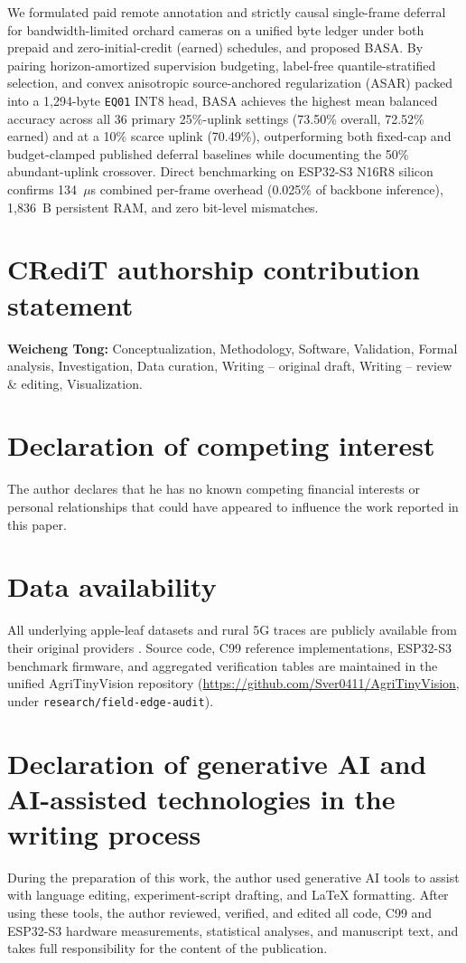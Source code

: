 \documentclass[preprint,12pt,authoryear]{elsarticle}
\begin{document}
We formulated paid remote annotation and strictly causal single-frame deferral for bandwidth-limited orchard cameras on a unified byte ledger under both prepaid and zero-initial-credit (earned) schedules, and proposed BASA. By pairing horizon-amortized supervision budgeting, label-free quantile-stratified selection, and convex anisotropic source-anchored regularization (ASAR) packed into a 1,294-byte \texttt{EQ01} INT8 head, BASA achieves the highest mean balanced accuracy across all 36 primary 25\%-uplink settings (73.50\% overall, 72.52\% earned) and at a 10\% scarce uplink (70.49\%), outperforming both fixed-cap and budget-clamped published deferral baselines while documenting the 50\% abundant-uplink crossover. Direct benchmarking on ESP32-S3 N16R8 silicon confirms 134~$\mu$s combined per-frame overhead (0.025\% of backbone inference), 1,836~B persistent RAM, and zero bit-level mismatches.

\section*{CRediT authorship contribution statement}
\textbf{Weicheng Tong:} Conceptualization, Methodology, Software, Validation, Formal analysis, Investigation, Data curation, Writing -- original draft, Writing -- review \& editing, Visualization.

\section*{Declaration of competing interest}
The author declares that he has no known competing financial interests or personal relationships that could have appeared to influence the work reported in this paper.

\section*{Data availability}
All underlying apple-leaf datasets and rural 5G traces are publicly available from their original providers \citep{singh2020,cornell,kashmir,latvia,forest}. Source code, C99 reference implementations, ESP32-S3 benchmark firmware, and aggregated verification tables are maintained in the unified AgriTinyVision repository (\url{https://github.com/Sver0411/AgriTinyVision}, under \texttt{research/field-edge-audit}).

\section*{Declaration of generative AI and AI-assisted technologies in the writing process}
During the preparation of this work, the author used generative AI tools to assist with language editing, experiment-script drafting, and \LaTeX{} formatting. After using these tools, the author reviewed, verified, and edited all code, C99 and ESP32-S3 hardware measurements, statistical analyses, and manuscript text, and takes full responsibility for the content of the publication.



\end{document}
